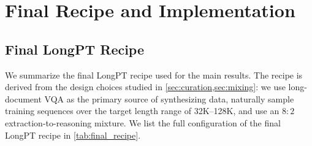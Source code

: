 \documentclass{llmxive}
\providecommand{\beginappendix}{\appendix{\titlefont\sffamily \seedblue{Appendix}\par}}
\begin{document}
{



\beginappendix
{}
\section{Final Recipe and Implementation}
\label{app:final_recipe_and_implem}
\subsection{Final LongPT Recipe}
\label{app:final_recipe}
We summarize the final LongPT recipe used for the main results.
The recipe is derived from the design choices studied in \cref{sec:curation,sec:mixing}: we use long-document VQA as the primary source of synthesizing data, naturally sample training sequences over the target length range of 32K--128K, and use an $8:2$ extraction-to-reasoning mixture. We list the full configuration of the final LongPT recipe in \cref{tab:final_recipe}.

}
\end{document}
